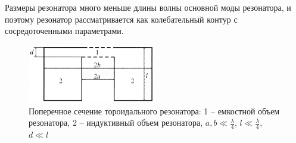 \documentclass[a4paper,14pt]{extarticle}
\begin{document}


Размеры резонатора много меньше длины волны основной моды резонатора, и  поэтому резонатор рассматривается как колебательный контур с сосредоточенными параметрами.

\begin{figure}[H]
  \centering
  \includegraphics[width=0.5\textwidth]{fig/fig2}
  \caption{Поперечное сечение тороидального резонатора: 1 -- емкостной объем резонатора, 2 -- индуктивный объем резонатора,  $a,b \ll \frac{\lambda}{4}$, $l \ll \frac{\lambda}{4}$, $d \ll l$}
  \label{fig:2}
\end{figure}
\end{document}
